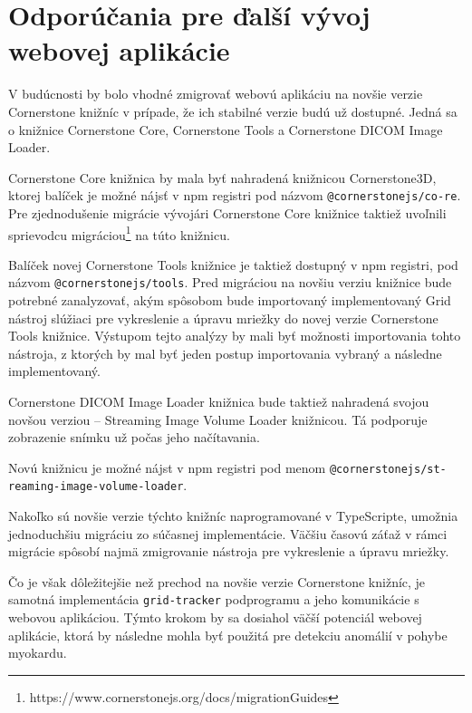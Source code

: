 \chapter {Odporúčania pre ďalší vývoj webovej aplikácie}
V budúcnosti by bolo vhodné zmigrovať webovú aplikáciu na novšie verzie Cornerstone knižníc v prípade, že ich stabilné verzie budú už dostupné. Jedná sa o knižnice Cornerstone Core, Cornerstone Tools a Cornerstone DICOM Image Loader.

Cornerstone Core knižnica by mala byť nahradená knižnicou Cornerstone3D, ktorej balíček je možné nájsť v npm registri pod názvom \texttt{@cornerstonejs/co-\newline re}. Pre zjednodušenie migrácie vývojári Cornerstone Core knižnice taktiež uvoľnili sprievodcu migráciou\footnote{https://www.cornerstonejs.org/docs/migrationGuides} na túto knižnicu.

Balíček novej Cornerstone Tools knižnice je taktiež dostupný v npm registri, pod názvom \texttt{@cornerstonejs/tools}. Pred migráciou na novšiu verziu knižnice bude potrebné zanalyzovať, akým spôsobom bude importovaný implementovaný Grid nástroj slúžiaci pre vykreslenie a úpravu mriežky do novej verzie Cornerstone Tools knižnice. Výstupom tejto analýzy by mali byť možnosti importovania tohto nástroja, z ktorých by mal byť jeden postup importovania vybraný a následne implementovaný.

\clearpage

Cornerstone DICOM Image Loader knižnica bude taktiež nahradená svojou novšou verziou -- Streaming Image Volume Loader knižnicou. Tá podporuje zobrazenie snímku už počas jeho načítavania.

Novú knižnicu je možné nájst v npm registri pod menom \texttt{@cornerstonejs/st-\newline reaming-image-volume-loader}.

Nakoľko sú novšie verzie týchto knižníc naprogramované v TypeScripte, umožnia jednoduchšiu migráciu zo súčasnej implementácie. Väčšiu časovú záťaž v rámci migrácie spôsobí najmä zmigrovanie nástroja pre vykreslenie a úpravu mriežky.

Čo je však dôležitejšie než prechod na novšie verzie Cornerstone knižníc, je samotná implementácia \texttt{grid-tracker} podprogramu a jeho komunikácie s webovou aplikáciou. Týmto krokom by sa dosiahol väčší potenciál webovej aplikácie, ktorá by následne mohla byť použitá pre detekciu anomálií v pohybe myokardu.